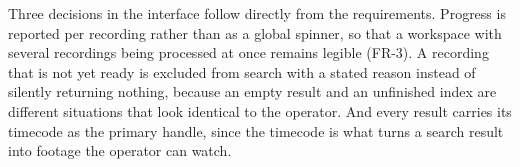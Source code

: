 Three decisions in the interface follow directly from the requirements. Progress is
reported per recording rather than as a global spinner, so that a workspace with several
recordings being processed at once remains legible (FR-3). A recording that is not yet
ready is excluded from search with a stated reason instead of silently returning nothing,
because an empty result and an unfinished index are different situations that look
identical to the operator. And every result carries its timecode as the primary handle,
since the timecode is what turns a search result into footage the operator can watch.
